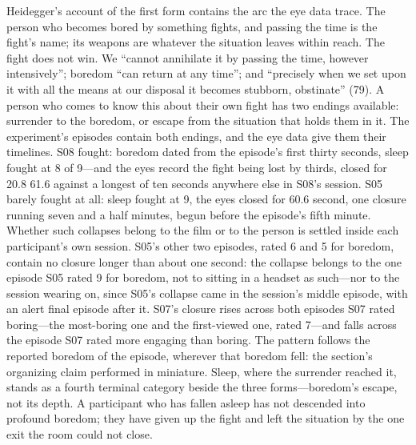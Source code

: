 Heidegger's account of the first form contains the arc the eye data trace. The person who
becomes bored by something fights, and passing the time is the fight's name; its weapons are
whatever the situation leaves within reach. The fight does not win. We ``cannot annihilate it
by passing the time, however intensively''; boredom ``can return at any time''; and
``precisely when we set upon it with all the means at our disposal it becomes stubborn,
obstinate'' (79). A person who comes to know this about their own fight has two endings
available: surrender to the boredom, or escape from the situation that holds them in it. The
experiment's episodes contain both endings, and the eye data give them their timelines. S08
fought: boredom dated from the episode's first thirty seconds, sleep fought at 8 of 9---and
the eyes record the fight being lost by thirds, closed for 20.8%
61.6%
against a longest of ten seconds anywhere else in S08's session. S05 barely fought at all:
sleep fought at 9, the eyes closed for 60.6%
second, one closure running seven and a half minutes, begun before the episode's fifth minute.
Whether such collapses belong to the film or to the person is settled inside each participant's
own session. S05's other two episodes, rated 6 and 5 for boredom, contain no closure longer
than about one second: the collapse belongs to the one episode S05 rated 9 for boredom, not to
sitting in a headset as such---nor to the session wearing on, since S05's collapse came in the
session's middle episode, with an alert final episode after it. S07's closure rises across both
episodes S07 rated boring---the most-boring one and the first-viewed one, rated 7---and falls
across the episode S07 rated more engaging than boring. The pattern follows the reported
boredom of the episode, wherever that boredom fell: the section's organizing claim performed
in miniature. Sleep, where the surrender reached it, stands as a fourth terminal category
beside the three forms---boredom's escape, not its depth. A participant who has fallen asleep
has not descended into profound boredom; they have given up the fight and left the situation
by the one exit the room could not close.

